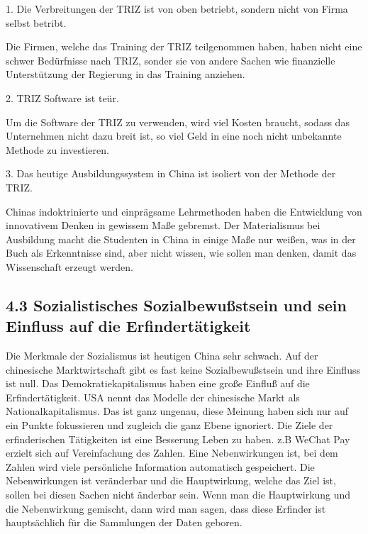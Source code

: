 \documentclass[11pt,a4paper]{article}
\begin{document}
1. Die Verbreitungen der TRIZ ist von oben betriebt, sondern nicht von Firma
selbst betribt.

Die Firmen, welche das Training der TRIZ teilgenommen haben, haben nicht eine
schwer Bedürfnisse nach TRIZ, sonder sie von andere Sachen wie finanzielle
Unterstützung der Regierung in das Training anziehen.

2. TRIZ Software ist teür.

Um die Software der TRIZ zu verwenden, wird viel Kosten braucht, sodass das
Unternehmen nicht dazu breit ist, so viel Geld in eine noch nicht unbekannte
Methode zu investieren.

3. Das heutige  Ausbildungssystem in China ist isoliert von der Methode der
TRIZ.

Chinas indoktrinierte und einprägsame Lehrmethoden haben die Entwicklung von
innovativem Denken in gewissem Maße gebremst. Der Materialismus bei Ausbildung
macht die Studenten in China in einige Maße nur weißen, was in der Buch als
Erkenntnisse sind, aber nicht wissen, wie sollen man denken, damit das
Wissenschaft erzeugt werden.

\subsection{4.3 Sozialistisches Sozialbewußstsein und sein Einfluss auf die
  Erfindertätigkeit} 

Die Merkmale der Sozialismus ist heutigen China sehr schwach. Auf der
chinesische Marktwirtschaft gibt es fast keine Sozialbewußstsein und ihre
Einfluss ist null. Das Demokratiekapitalismus haben eine große Einfluß auf die
Erfindertätigkeit. USA nennt das Modelle der chinesische Markt als
Nationalkapitalismus. Das ist ganz ungenau, diese Meinung haben sich nur auf
ein Punkte fokussieren und zugleich die ganz Ebene ignoriert. Die Ziele der
erfinderischen Tätigkeiten ist eine Besserung Leben zu haben. z.B WeChat Pay
erzielt sich auf Vereinfachung des Zahlen. Eine Nebenwirkungen ist, bei dem
Zahlen wird viele persönliche Information automatisch gespeichert. Die
Nebenwirkungen ist veränderbar und die Hauptwirkung, welche das Ziel ist,
sollen bei diesen Sachen nicht änderbar sein. Wenn man die Hauptwirkung und
die Nebenwirkung gemischt, dann wird man sagen, dass diese Erfinder ist
hauptsächlich für die Sammlungen der Daten geboren.
\end{document}
